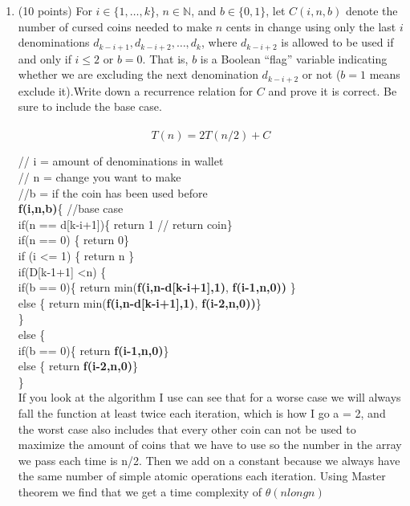 \documentclass[12pt]{article}
\newcommand\tab[1][1cm]{\hspace*{#1}}
\begin{document}
\begin{enumerate}
\begin{enumerate}
\item \label{3a} (10 points) For $i \in \{1,\dotsc,k\}$, $n \in \mathbb{N}$, and $b \in \{0,1\}$, let
    $C(i,n,b)$ denote the number of cursed coins needed to make $n$ cents in
    change using only the last $i$ denominations $d_{k-i+1}, d_{k-i+2}, \dotsc, d_k$,
    where $d_{k-i+2}$ is allowed to be used if and only if $i \leq 2$ or
    $b=0$. That is, $b$ is a Boolean ``flag'' variable indicating whether
    we are excluding the next denomination $d_{k-i+2}$ or not ($b=1$ means exclude
    it).Write down a recurrence relation for $C$ and prove it is
    correct. Be sure to include the base case.\\\\
    $$T(n) = 2T(n/2) + C $$
    
    // i = amount of denominations in wallet\\
    // n = change you want to make\\
    //b = if the coin has been used before \\
    
    {\bf f(i,n,b)}\{ 
    \tab //base case\\
    \tab if(n == d[k-i+1])\{ return 1 // return coin\} \\
	\tab if(n == 0) \{ return 0\} \\
	\tab if (i \textless= 1) \{ return n \} \\
	\tab if(D[k-1+1] \textless n) \{ \\
	\tab \tab if(b == 0)\{ return min({\bf f(i,n-d[k-i+1],1)}, {\bf f(i-1,n,0))} \} \\
	\tab \tab else \{ return min({\bf f(i,n-d[k-i+1],1)}, {\bf f(i-2,n,0))}\} \\
	\tab \} \\
	\tab else \{ \\
	\tab \tab if(b == 0)\{ return {\bf f(i-1,n,0)}\} \\
	\tab \tab else \{ return {\bf f(i-2,n,0)}\} \\
	\tab \} \\
	
	If you look at the algorithm I use can see that for a worse case we will always fall the function at least twice each iteration, which is how I go a = 2, and the worst case also includes that every other coin can not be used to maximize the amount of coins that we have to use so the number in the array we pass each time is n/2. Then we add on a constant because we always have the same number of simple atomic operations each iteration. Using Master theorem we find that we get a time complexity of  $\theta(nlongn) $
    

\end{enumerate}
\end{enumerate}
\end{document}
